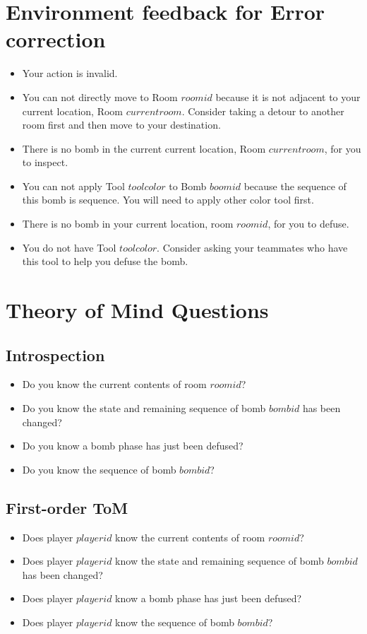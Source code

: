 \documentclass[11pt]{article}
\begin{document}
\section{Environment feedback for Error correction}

\begin{itemize}
  \item Your action is invalid.
  \item You can not directly move to Room ${room id}$ because it is not adjacent to your current location, Room ${current room}$. Consider taking a detour to another room first and then move to your destination.
  \item There is no bomb in the current current location, Room ${current room}$, for you to inspect.
\item You can not apply Tool ${tool color}$ to Bomb ${boom id}$ because the sequence of this bomb is {sequence}. You will need to apply other color tool first.
\item There is no bomb in your current location, room ${room id}$, for you to defuse.
\item You do not have Tool ${tool color}$. Consider asking your teammates who have this tool to help you defuse the bomb.
\end{itemize}


\section{Theory of Mind Questions}

\subsection{Introspection}
\begin{itemize}
  \item Do you know the current contents of room ${room id}$?
  \item Do you know the state and remaining sequence of bomb ${bomb id}$ has been changed?
\item Do you know a bomb phase has just been defused?
\item Do you know the sequence of bomb ${bomb id}$?
\end{itemize}

\subsection{First-order ToM}
\begin{itemize}
  \item Does player ${player id}$ know the current contents of room ${room id}$?
  \item Does player ${player id}$ know the state and remaining sequence of bomb ${bomb id}$ has been changed?
\item Does player ${player id}$ know a bomb phase has just been defused?
\item Does player ${player id}$ know the sequence of bomb ${bomb id}$?
\end{itemize}
\end{document}
